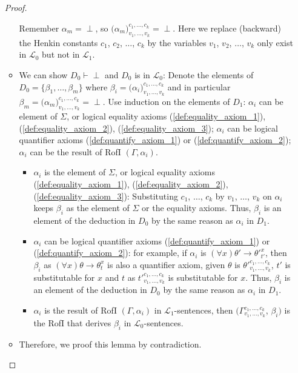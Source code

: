 \documentclass[11pt,letterpaper]{book}
\theoremstyle{definition}
\begin{document}
\begin{enumerate}
\begin{proof}
\begin{itemize}
{Remember $\alpha_m = \perp$, so $\big( \alpha_m \big)_{v_1, \ldots, v_k}
^{c_1, \ldots, c_k} = \perp$. Here we replace (backward) the Henkin
constants $c_1$, $c_2$, $\ldots$, $c_k$ by the variables $v_1$, $v_2$,
$\ldots$, $v_k$ only exist in $\mathcal{L}_0$ but not in $\mathcal{L}_1$.
}
\item{We can show $D_0 \vdash \perp$ and $D_0$ is in $\mathcal{L}_0$:
Denote the elements of $D_0=\{ \beta_1, \ldots, \beta_m \}$ where
$\beta_i = \big( \alpha_i \big)_{v_1, \ldots, v_k}  ^{c_1, \ldots, c_k}$
and in particular $\beta_m = \big( \alpha_m \big)_{v_1, \ldots, v_k}
^{c_1, \ldots, c_k}=\perp$. Use induction on the elements of $D_1$:
$\alpha_i$ can be element of $\Sigma$, or logical equality axioms
(\ref{def:equality_axiom_1}), (\ref{def:equality_axiom_2}),
(\ref{def:equality_axiom_3}); $\alpha_i$ can be logical quantifier
axioms (\ref{def:quantify_axiom_1}) or (\ref{def:quantify_axiom_2});
$\alpha_i$ can be the result of RofI $(\Gamma, \alpha_i)$.}
\begin{itemize}
\item{$\alpha_i$ is the element of $\Sigma$, or logical equality axioms
(\ref{def:equality_axiom_1}), (\ref{def:equality_axiom_2}),
(\ref{def:equality_axiom_3}): Substituting $c_1$, $\ldots$, $c_k$ by
$v_1$, $\ldots$, $v_k$ on $\alpha_i$ keeps $\beta_i$ as the element of
$\Sigma$ or the equality axioms. Thus, $\beta_i$ is an element of the
deduction in $D_0$ by the same reason as $\alpha_i$ in $D_1$. }
\item{$\alpha_i$ can be logical quantifier axioms
(\ref{def:quantify_axiom_1}) or (\ref{def:quantify_axiom_2}): for
example, if  $\alpha_i $ is $ (\forall x) \theta' \rightarrow
{\theta'}_{t'} ^{ x}  $, then $\beta_i$ as $(\forall x) \theta
\rightarrow \theta ^{x} _{t} $ is also a quantifier axiom, given
$\theta$ is ${\theta'} _{v_1, \ldots, v_k} ^{c_1, \ldots, c_k} $, $t' $
is substitutable for $x$ and $t$ as ${t'} _{v_1, \ldots, v_k} ^{c_1,
\ldots, c_k}$ is substitutable for $x$. Thus, $\beta_i$ is an element of
the deduction in $D_0$ by the same reason as $\alpha_i$ in $D_1$.}
\item{$\alpha_i$ is the result of RofI $(\Gamma, \alpha_i)$ in
$\mathcal{L}_1$-sentences, then $( \Gamma  _{v_1, \ldots, v_k} ^{c_1,
\ldots, c_k} $, $\beta_i ) $ is the RofI that derives $\beta_i$ in
$\mathcal{L}_0$-sentences. }
\end{itemize}

\item{Therefore, we proof this lemma by contradiction.}


\end{itemize}
\end{proof}
\end{enumerate}
\end{document}
